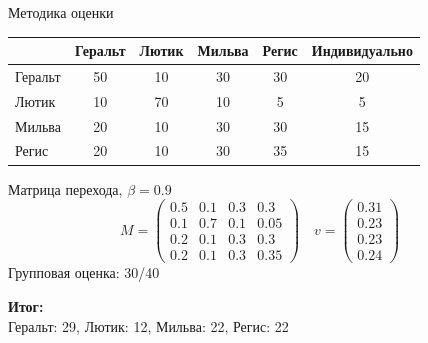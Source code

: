\documentclass[10pt,a4paper]{beamer}
\begin{document}
\begin{frame}{Методика оценки}

\begin{center}
\begin{tabular}{l | c c c c | c}
 & Геральт & Лютик & Мильва & Регис & Индивидуально \\
\hline
Геральт & 50 & 10 & 30 & 30 & 20\\
Лютик & 10 & 70 & 10 & 5  & 5\\
Мильва & 20 & 10 & 30 & 30 & 15\\
Регис & 20 & 10 & 30 & 35 & 15
\end{tabular}
\end{center}

Матрица перехода, $\beta=0.9$ 
\[
M = \begin{pmatrix}
0.5 & 0.1 & 0.3 & 0.3 \\
0.1 & 0.7 & 0.1 & 0.05 \\
0.2 & 0.1 & 0.3 & 0.3 \\
0.2 & 0.1 & 0.3 & 0.35
\end{pmatrix} \quad
v = \begin{pmatrix}
0.31 \\
0.23 \\
0.23 \\
0.24
\end{pmatrix}
\]
Групповая оценка: 30/40

\vspace{1em}
{\bf Итог:} \\ 
Геральт: 29, Лютик: 12, Мильва: 22, Регис: 22

\end{frame}

\end{document}
